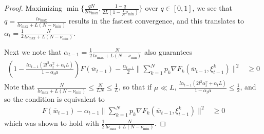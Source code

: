 \begin{proof}
	Maximizing $\min\{\frac{qN}{2l\nu_{\max}},\frac{1-q}{2L(1-\frac{1}{N}\nu_{\min})}\}$
	over $q\in[0,1]$, we see that $q=\frac{l\nu_{\max}}{l\nu_{\max}+L(N-\nu_{\min})}$
	results in the fastest convergence, and this translates to $\alpha_{t}=\frac{1}{2}\frac{N}{l\nu_{\max}+L(N-\nu_{\min})}$. 
	
	Next we note that $\alpha_{t-1}=\frac{1}{2}\frac{N}{l\nu_{\max}+L(N-\nu_{\min})}$
	also guarantees
	\begin{align*}
	(1-\frac{l\alpha_{t-1}(2l^{2}\alpha_{t}^{2}+\alpha_{t}L)}{1-\alpha_{t}\mu})F(\overline{w}_{t-1})-\frac{\alpha_{t-1}}{2}\|\sum_{k=1}^{N}p_{k}\nabla F_{k}(\overline{w}_{t-1},\xi_{t-1}^{k})\|^{2} & \geq0
	\end{align*}
	Note that $\frac{N}{l\nu_{\max}+L(N-\nu_{\min})}\leq\frac{N}{LN}\leq\frac{1}{L}$,
	so that if $\mu\ll L$, $\frac{l\alpha_{t-1}(2l^{2}\alpha_{t}^{2}+\alpha_{t}L)}{1-\alpha_{t}\mu}\leq\frac{1}{2}$,
	and so the condition is equivalent to 
	\begin{align*}
	F(\overline{w}_{t-1})-\alpha_{t-1}\|\sum_{k=1}^{N}p_{k}\nabla F_{k}(\overline{w}_{t-1},\xi_{t-1}^{k})\|^{2} & \geq0
	\end{align*}
	which was shown to hold with $\frac{1}{2}\frac{N}{l\nu_{\max}+L(N-\nu_{\min})}$. 
	

\end{proof}
